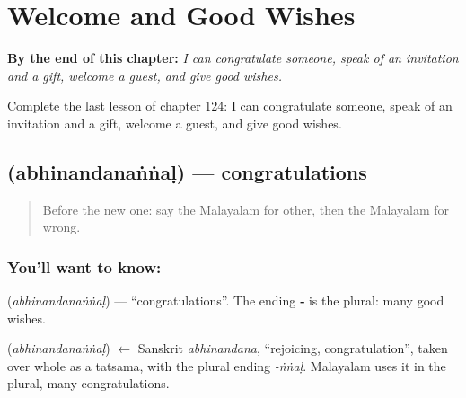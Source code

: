 
\chapter{Welcome and Good Wishes}
\label{ch:ml-welcome-good-wishes}

\begin{chapteropening}
\textbf{By the end of this chapter:} \emph{I can congratulate someone, speak of an invitation and a gift, welcome a guest, and give good wishes.}

Complete the last lesson of chapter 124: I can congratulate someone, speak of an invitation and a gift, welcome a guest, and give good wishes.
\end{chapteropening}

\section[\texorpdfstring{\ml{അഭിനന്ദനങ്ങൾ} (abhinandanaṅṅaḷ)}{അഭിനന്ദനങ്ങൾ (abhinandanaṅṅaḷ)}]{ (abhinandanaṅṅaḷ) — congratulations}

\label{lesson:ML-C124-congratulations}



\begin{quote}
Before the new one: say the Malayalam for other, then the Malayalam for wrong.
\end{quote}

\subsection*{You'll want to know: }
\textbf{} (\emph{abhinandanaṅṅaḷ}) — \textquotedblleft{}congratulations\textquotedblright{}. The ending \textbf{‑} is the plural: many good wishes.

\begin{cousinweb}
\textbf{} (\emph{abhinandanaṅṅaḷ}) $\leftarrow$ Sanskrit \emph{abhinandana}, \textquotedblleft{}rejoicing, congratulation\textquotedblright{}, taken over whole as a tatsama, with the plural ending \emph{-ṅṅaḷ}. Malayalam uses it in the plural, many congratulations.
\end{cousinweb}

